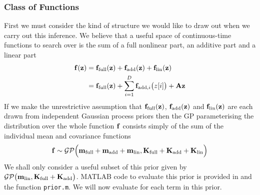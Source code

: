 \subsubsection{Class of Functions}
First we must consider the kind of structure we would like to draw out when we carry out this inference. We believe that a useful space of continuous-time functions to search over is the sum of a full nonlinear part, an additive part and a linear part
\begin{align}
\mathbf{f}(\mathbf{z}) &=  \mathbf{f}_{\text{full}}(\mathbf{z}) + \mathbf{f}_{\text{add}}(\mathbf{z})  + \mathbf{f}_{\text{lin}}(\mathbf{z})\\
\nonumber &= \mathbf{f}_{\text{full}}(\mathbf{z}) + \sum_{i=1}^D\mathbf{f}_{\text{add},i}\big(z[i]\big) + \mathbf{A}\mathbf{z}
\end{align}
If we make the unrestrictive assumption that $\mathbf{f}_{\text{full}}(\mathbf{z})$, $\mathbf{f}_{\text{add}}(\mathbf{z})$ and $\mathbf{f}_{\text{lin}}(\mathbf{z})$ are each drawn from independent Gaussian process priors then the GP parameterising the distribution over the whole function $\mathbf{f}$ consists simply of the sum of the individual mean and covariance functions
\begin{equation*}
\mathbf{f} \sim \mathcal{GP}\Big(\mathbf{m}_{\text{full}} + \mathbf{m}_{\text{add}} + \mathbf{m}_{\text{lin}},
\mathbf{K}_{\text{full}} + \mathbf{K}_{\text{add}} + \mathbf{K}_{\text{lin}} \Big)
\end{equation*}
We shall only consider a useful subset of this prior given by $\mathcal{GP}\big(\mathbf{m}_{\text{lin}}, \mathbf{K}_{\text{full}} + \mathbf{K}_{\text{add}} \big)$.  MATLAB code to evaluate this prior is provided in  and the function \texttt{prior.m}. We will now evaluate  for each term in this prior.




